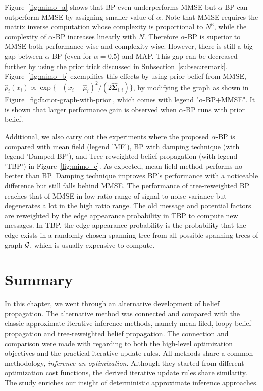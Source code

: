 Figure~\ref{fig:mimo_a} shows that BP even underperforms MMSE but $\alpha$-BP can outperform MMSE by assigning smaller value of $\alpha$.
Note that MMSE requires the matrix inverse computation whose complexity is proportional to $N^3$, while the complexity of $\alpha$-BP increases linearly with $N$. Therefore $\alpha$-BP is superior to MMSE both performance-wise and complexity-wise.  
However, there is still a big gap between $\alpha$-BP (even for $\alpha=0.5$) and MAP. This gap can be decreased further by using the prior trick discussed in Subsection~\ref{subsec:remark}. Figure~\ref{fig:mimo_b} exemplifies this effects by using prior belief from MMSE, $\hat{p}_i(x_i)\propto \exp\{-(x_i-\hat{\mu}_i)^2/(2\hat{\bm{\Sigma}}_{i,i})\}$, by modifying the graph as shown in Figure~\ref{fig:factor-graph-with-prior}, which comes with legend "$\alpha$-BP$+$MMSE". It is shown that larger performance gain is observed when $\alpha$-BP runs with prior belief.

Additional, we also carry out the experiments where the proposed $\alpha$-BP is compared with mean field (legend 'MF'), BP with damping technique \cite{Pretti2005damping} (with legend 'Damped-BP'), and Tree-reweighted belief propagation \cite{wainwright2008graphical} (with legend 'TBP') in Figure~\ref{fig:mimo_c}. As expected, mean field method performs no better than BP. Damping technique improves BP's performance with a noticeable difference but still falls behind MMSE. The performance of tree-reweighted BP reaches that of MMSE in low ratio range of signal-to-noise variance but degenerates a lot in the high ratio range. The old message and potential factors are reweighted by the edge appearance probability in TBP to compute new messages. In TBP, the edge appearance probability is the probability that the edge exists in a randomly chosen spanning tree from all possible spanning trees of graph $\mathcal{G}$, which is usually expensive to compute.

\section{Summary}
In this chapter, we went through an alternative development of belief propagation. The alternative method was connected and compared with the classic approximate iterative inference methods, namely mean filed, loopy belief propagation and tree-reweighted belief propagation. The connection and comparison were made with regarding to both the high-level optimization objectives and the practical iterative update rules. All methods share a common methodology, \textit{inference an optimization}. Although they started from different optimization cost functions, the derived iterative update rules share similarity. The study enriches our insight of deterministic approximate inference approaches.

